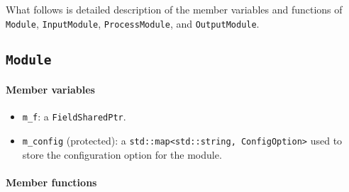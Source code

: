 What follows is detailed description of the member variables and functions of \verb+Module+, \verb+InputModule+, \verb+ProcessModule+, and \verb+OutputModule+.

\subsection{\texttt{Module}}

\paragraph{Member variables}

\begin{itemize}

\item \verb+m_f+: a \verb+FieldSharedPtr+.

\item \verb+m_config+ (protected): a \verb+std::map<std::string, ConfigOption>+ used to store the configuration option for the module.

\end{itemize}

\paragraph{Member functions}

